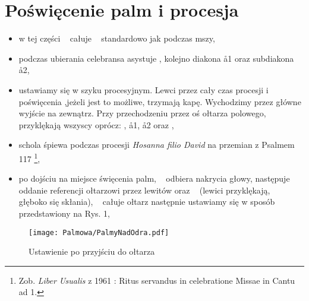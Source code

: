 \section{Poświęcenie palm i procesja}
	
		\begin{itemize}
			\item w tej części \dd~ całuje \ii~ standardowo jak podczas mszy,
			\item podczas ubierania celebransa asystuje \cc, kolejno diakona \aa1 oraz subdiakona \aa2,
			\item ustawiamy się w szyku procesyjnym. Lewci przez cały czas procesji i poświęcenia ,jeżeli jest to możliwe, trzymają kapę. Wychodzimy przez główne wyjście na zewnątrz. Przy przechodzeniu przez oś ołtarza polowego, przyklękają wszyscy oprócz: , \aa1, \aa2 oraz \ii,
			\item schola śpiewa podczas procesji \textit{Hosanna filio David} na przemian z Psalmem 117 \footnote{Zob. \textit{Liber Usualis} z 1961 : Ritus servandus in celebratione Missae in Cantu ad 1.},
			\item po dojściu na miejsce święcenia palm, \cc~ odbiera nakrycia głowy, następuje  oddanie referencji ołtarzowi przez lewitów oraz \ii~ (lewici przyklękają, \ii~ głęboko się skłania), \ii~ całuje ołtarz następnie ustawiamy się w sposób przedstawiony na Rys. 1,
		\end{itemize}
	
		\bigskip
	
		\begin{figure}[h]
			\centering
			\texttt{[image: Palmowa/PalmyNadOdra.pdf]}
			\caption{Ustawienie po przyjściu do ołtarza}
		\end{figure}
	
		\bigskip
	
